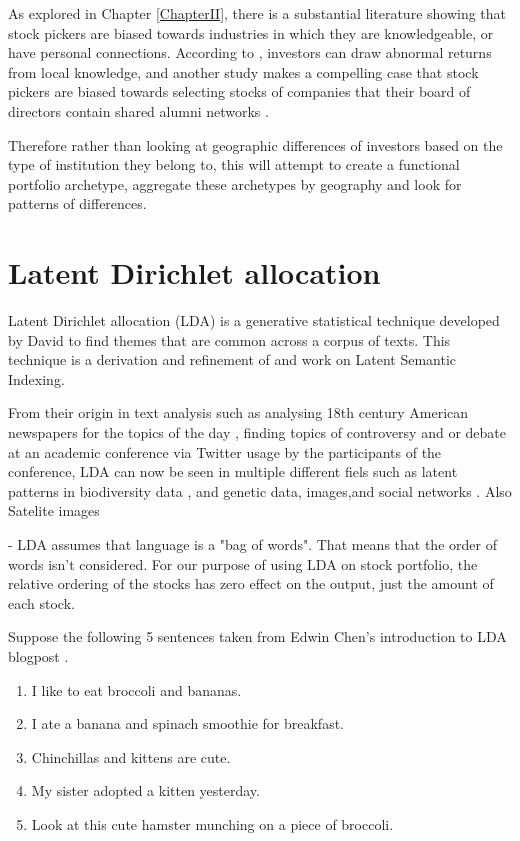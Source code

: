 As explored in Chapter \ref{ChapterII}, there is a substantial literature showing that stock pickers are biased towards industries in which they are knowledgeable, or have personal connections.  According to \cite{covalthe2001}, investors can draw abnormal returns from local knowledge, and another study makes a compelling case that stock pickers are biased towards selecting stocks of companies that their board of directors contain shared alumni networks \citep{Cohen2008} .  

Therefore rather than looking at geographic differences of investors based on the type of institution they belong to, this will attempt to create a functional portfolio archetype, aggregate these archetypes by geography and look for patterns of differences.   
	
\section{Latent Dirichlet allocation}

	
Latent Dirichlet allocation (LDA)  is a generative statistical technique developed by David \cite{blei2003latent} to find themes that are common across a corpus of texts.  This technique is a derivation and refinement of \cite{Papadimitriou98} and \cite{PAPADIMITRIOU2000217} work on Latent Semantic Indexing.  

From their origin in text analysis such as analysing 18th century American newspapers for the topics of the day \citep{newman2006probabilistic},  finding topics of controversy and or debate at an academic conference via Twitter usage by the participants of the conference\citep{Marwick2013}, LDA can now be seen in multiple different fiels such as latent patterns in biodiversity data \citep{Vale2014}, and genetic data, images,and social networks \citep{Blei2012}.  Also Satelite images \cite{Lienou2010}

- LDA assumes that language is a "bag of words".  That means that the order of words isn't considered.  For our purpose of using LDA on stock portfolio, the relative ordering of the stocks has zero effect on the output, just the amount of each stock.  

Suppose the following 5 sentences taken from Edwin Chen's introduction to LDA blogpost \cite{Chen2011}.

	\begin{enumerate}
		\singlespacing 
		\item I like to eat broccoli and bananas.
		\item I ate a banana and spinach smoothie for breakfast.
		\item Chinchillas and kittens are cute.
		\item My sister adopted a kitten yesterday.
		\item Look at this cute hamster munching on a piece of broccoli.
	\end{enumerate}

